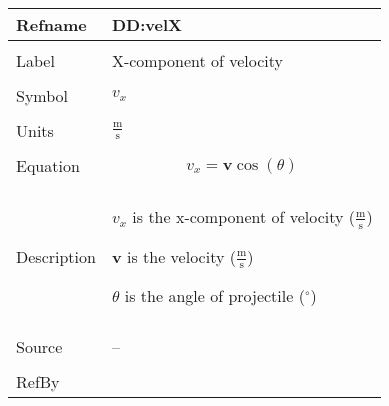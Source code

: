 \documentclass[12pt]{article}
\begin{document}
\noindent \begin{minipage}{\textwidth}
\begin{tabular}{p{} p{}}
\toprule \textbf{Refname} & \textbf{DD:velX}
\label{DD:velX}
\\ \midrule \\
Label & X-component of velocity
\\ \midrule \\
Symbol & ${v_{x}}$
\\ \midrule \\
Units & $\frac{\text{m}}{\text{s}}$
\\ \midrule \\
Equation & \begin{displaymath}
           {v_{x}}=\mathbf{v} \cos\left(θ\right)
           \end{displaymath}
\\ \midrule \\
Description & \begin{symbDescription}
              \item{${v_{x}}$ is the x-component of velocity ($\frac{\text{m}}{\text{s}}$)}
              \item{$\mathbf{v}$ is the velocity ($\frac{\text{m}}{\text{s}}$)}
              \item{$θ$ is the angle of projectile (${}^{\circ}$)}
              \end{symbDescription}
\\ \midrule \\
Source & --
\\ \midrule \\
RefBy & 
\\ \bottomrule \end{tabular}
\end{minipage}
\par~
\end{document}
